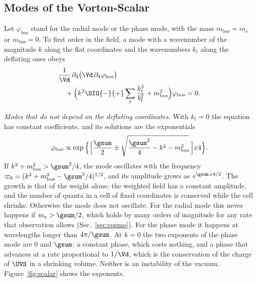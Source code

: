 \subsection{Modes of the Vorton-Scalar}
\label{sec:scalarmodes}

Let $\varphi_{\mathrm{bos}}$ stand for the radial mode or the phase mode, with the mass
$m_{\mathrm{bos}}=m_s$ or $m_{\mathrm{bos}}=0$. To first order in the field, a mode with a wavenumber
of the magnitude $k$ along the flat coordinates and the wavenumbers $k_t$ along the deflating ones
obeys
\begin{equation}
\begin{aligned}
&\frac{1}{\Vd}\,\partial_4\big(\Vd\,\partial_4\varphi_{\mathrm{bos}}\big)\\
&\quad+\Big(k^{2}\SIG{-}{+}\sum_t\frac{k_t^{2}}{b_t^{2}}+m_{\mathrm{bos}}^{2}\Big)\varphi_{\mathrm{bos}}=0 .
\end{aligned}
\label{eq:scalar}
\end{equation}

\emph{Modes that do not depend on the deflating coordinates.} With $k_t=0$ the equation has constant
coefficients, and its solutions are the exponentials
\begin{equation}
\varphi_{\mathrm{bos}}\propto\exp\Big\{\Big[\frac{\gsum}{2}\pm\sqrt{\frac{\gsum^{2}}{4}-k^{2}-m_{\mathrm{bos}}^{2}}\,\Big]x4\Big\}.
\label{eq:exponents}
\end{equation}
If $k^{2}+m_{\mathrm{bos}}^{2}>\gsum^{2}/4$, the mode oscillates with the frequency
$\varpi_b=(k^{2}+m_{\mathrm{bos}}^{2}-\gsum^{2}/4)^{1/2}$, and its amplitude grows as
$e^{\gsum\,x4/2}$. The growth is that of the weight alone: the weighted field has a constant
amplitude, and the number of quanta in a cell of fixed coordinates is conserved while the cell
shrinks. Otherwise the mode does not oscillate. For the radial mode this never happens if
$m_s>\gsum/2$, which holds by many orders of magnitude for any rate that observation allows
(Sec.~\ref{sec:cosmo}). For the phase mode it happens at wavelengths longer than $4\pi/\gsum$. At
$k=0$ the two exponents of the phase mode are $0$ and $\gsum$: a constant phase, which costs nothing,
and a phase that advances at a rate proportional to $1/\Vd$, which is the conservation of the charge
of $\UVS$ in a shrinking volume. Neither is an instability of the vacuum. Figure~\ref{fig:scalar}
shows the exponents.

